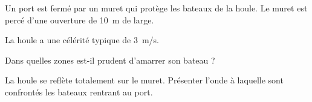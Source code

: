 

Un port est fermé par un muret qui protège les bateaux de la houle. Le muret est percé d'une ouverture de \SI{10}{m} de large.

La houle a une célérité typique de \SI{3}{m/s}.

\question Dans quelles zones est-il prudent d'amarrer son bateau ?

\question La houle se reflète totalement sur le muret. Présenter l'onde à laquelle sont confrontés les bateaux rentrant au port.
